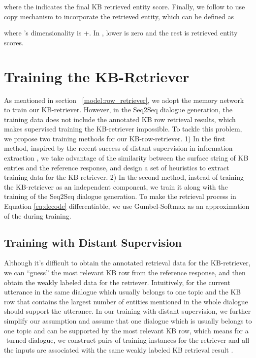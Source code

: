 \documentclass[11pt,a4paper]{article}
\begin{document}
 where the   indicates the final KB retrieved entity score.
 Finally, we follow	 to use copy mechanism to incorporate the retrieved entity, which can be defined as 
  
 where ’s dimensionality is  +. In  , lower  is zero and the rest is retrieved entity scores.

 \section{Training the KB-Retriever}
 As mentioned in section~ \ref{model:row_retriever}, we adopt the memory network to train our KB-retriever.
 However, in the Seq2Seq dialogue generation,
 the training data does not include the
 annotated KB row retrieval results, which makes
 supervised
 training the KB-retriever impossible.
 To tackle this problem,
 we propose two training methods for our KB-row-retriever.
 1) In the first method, inspired by the recent success of
 distant supervision in information extraction \cite{zeng2015distant,mintz2009distant,N13-1095,xu2013filling},
 we take advantage of the similarity between the surface string
 of KB entries and the reference response, and
 design a set of heuristics to extract training data for the KB-retriever.
 2) In the second method, instead of training the KB-retriever as
 an independent component, we train it along with the
 training of the Seq2Seq dialogue generation.
 To make the retrieval process in Equation \ref{eq:decode} differentiable,
 we use Gumbel-Softmax \cite{45822} as an approximation of the  during training.
 
 \subsection{Training with Distant Supervision}
 Although it's difficult to obtain
 the annotated retrieval data for the KB-retriever,
 we can ``guess'' the most relevant KB row from
 the reference response,
 and then obtain the weakly labeled data for the retriever.
Intuitively, for the current utterance in the same dialogue which usually belongs to one topic and the KB row that contains the largest number of
entities mentioned in the whole dialogue should support the utterance.
 In our training with distant supervision, 
 we further simplify our assumption and 
 assume that
 one dialogue which is usually belongs to one topic and can be supported by the most relevant KB row,
 which means for a -turned dialogue, we construct
  pairs of training instances for the retriever and all
 the inputs  are associated
 with the same weakly labeled KB retrieval result .
 
\end{document}
